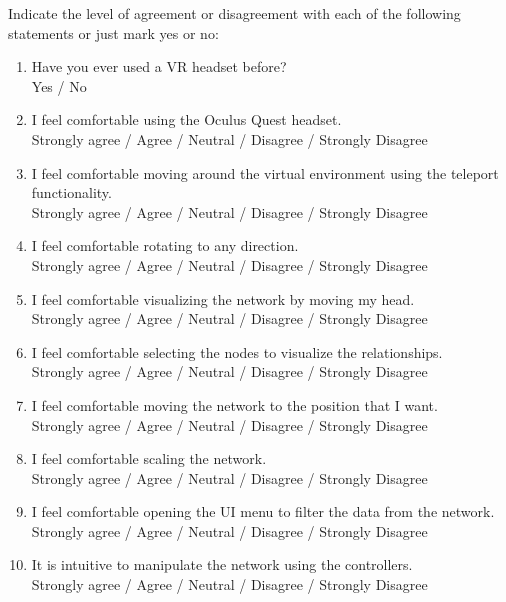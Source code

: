 Indicate the level of agreement or disagreement with each of the following statements or just mark yes or no:
\begin{enumerate}
  \item Have you ever used a VR headset before?\\
  Yes / No

  \item I feel comfortable using the Oculus Quest headset.\\
  Strongly agree / Agree / Neutral / Disagree / Strongly Disagree

  \item I feel comfortable moving around the virtual environment using the teleport functionality.\\
  Strongly agree / Agree / Neutral / Disagree / Strongly Disagree

  \item I feel comfortable rotating to any direction.\\
  Strongly agree / Agree / Neutral / Disagree / Strongly Disagree

  \item I feel comfortable visualizing the network by moving my head.\\
  Strongly agree / Agree / Neutral / Disagree / Strongly Disagree

  \item I feel comfortable selecting the nodes to visualize the relationships.\\
  Strongly agree / Agree / Neutral / Disagree / Strongly Disagree

  \item I feel comfortable moving the network to the position that I want.\\
  Strongly agree / Agree / Neutral / Disagree / Strongly Disagree

  \item I feel comfortable scaling the network.\\
  Strongly agree / Agree / Neutral / Disagree / Strongly Disagree

  \item I feel comfortable opening the UI menu to filter the data from the network.\\
  Strongly agree / Agree / Neutral / Disagree / Strongly Disagree

  \item It is intuitive to manipulate the network using the controllers.\\
  Strongly agree / Agree / Neutral / Disagree / Strongly Disagree


\end{enumerate}

